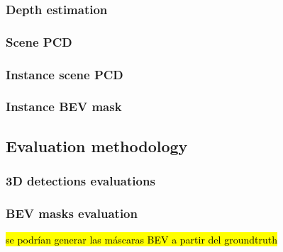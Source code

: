 \subsubsection{Depth estimation}
\subsubsection{Scene PCD}
\subsubsection{Instance scene PCD}
\subsubsection{Instance BEV mask}

\subsection{Evaluation methodology}
\label{evaluacion}

\subsubsection{3D detections evaluations}
\subsubsection{BEV masks evaluation}
\hl{se podrían generar las máscaras BEV a partir del groundtruth}


